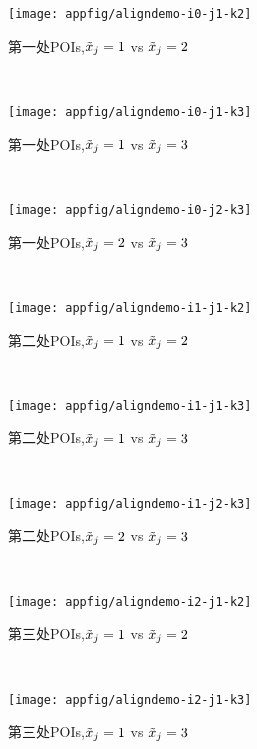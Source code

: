 {	\begin{appfig}[!htb]
		\centering
		\begin{subfigure}[b]{\trif\textwidth}
			\texttt{[image: appfig/aligndemo-i0-j1-k2]}
			\caption{第一处POIs,$\tilde{x}_j=1$ vs $\tilde{x}_j=2$}
			\label{fig:aligndemo012}
		\end{subfigure}%
		~%
		\begin{subfigure}[b]{\trif\textwidth}
			\texttt{[image: appfig/aligndemo-i0-j1-k3]}
			\caption{第一处POIs,$\tilde{x}_j=1$ vs $\tilde{x}_j=3$}
			\label{fig:aligndemo013}
		\end{subfigure}
		~%
		\begin{subfigure}[b]{\trif\textwidth}
			\texttt{[image: appfig/aligndemo-i0-j2-k3]}
			\caption{第一处POIs,$\tilde{x}_j=2$ vs $\tilde{x}_j=3$}
			\label{fig:aligndemo023}
		\end{subfigure}
		\\%
		\begin{subfigure}[b]{\trif\textwidth}
			\texttt{[image: appfig/aligndemo-i1-j1-k2]}
			\caption{第二处POIs,$\tilde{x}_j=1$ vs $\tilde{x}_j=2$}
			\label{fig:aligndemo112}
		\end{subfigure}%
		~%
		\begin{subfigure}[b]{\trif\textwidth}
			\texttt{[image: appfig/aligndemo-i1-j1-k3]}
			\caption{第二处POIs,$\tilde{x}_j=1$ vs $\tilde{x}_j=3$}
			\label{fig:aligndemo113}
		\end{subfigure}
		~%
		\begin{subfigure}[b]{\trif\textwidth}
			\texttt{[image: appfig/aligndemo-i1-j2-k3]}
			\caption{第二处POIs,$\tilde{x}_j=2$ vs $\tilde{x}_j=3$}
			\label{fig:aligndemo123}
		\end{subfigure}
		\\%
		\begin{subfigure}[b]{\trif\textwidth}
			\texttt{[image: appfig/aligndemo-i2-j1-k2]}
			\caption{第三处POIs,$\tilde{x}_j=1$ vs $\tilde{x}_j=2$}
			\label{fig:aligndemo212}
		\end{subfigure}%
		~%
		\begin{subfigure}[b]{\trif\textwidth}
			\texttt{[image: appfig/aligndemo-i2-j1-k3]}
			\caption{第三处POIs,$\tilde{x}_j=1$ vs $\tilde{x}_j=3$}
			\label{fig:aligndemo213}

\end{subfigure}
\end{appfig}}
